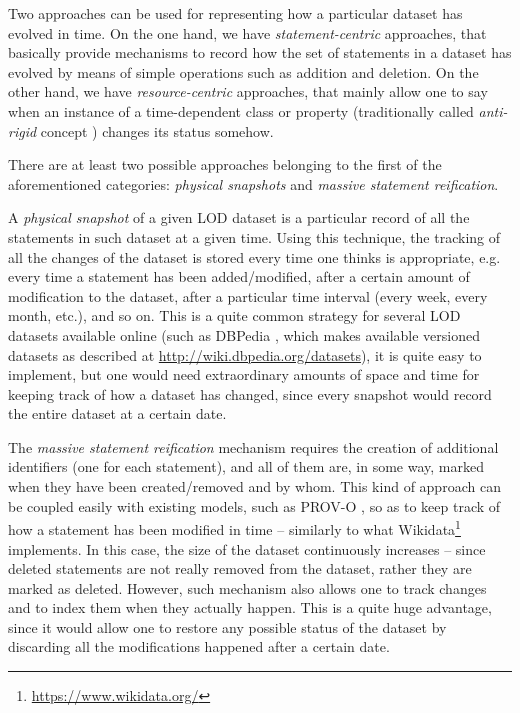 \documentclass[runningheads,a4paper]{llncs}
\begin{document}
Two approaches can be used for representing how a particular dataset has evolved in time. On the one hand, we have {\em statement-centric} approaches, that basically provide mechanisms to record how the set of statements in a dataset has evolved by means of simple operations such as addition and deletion. On the other hand, we have {\em resource-centric} approaches, that mainly allow one to say when an instance of a time-dependent class or property (traditionally called {\em anti-rigid} concept  \cite{__RefNumPara__21031_1591320820}) changes its status somehow.

There are at least two possible approaches belonging to the first of the aforementioned categories: {\em physical snapshots} and {\em massive statement reification}.

A {\em physical snapshot} of a given LOD dataset is a particular record of all the statements in such dataset at a given time. Using this technique, the tracking of all the changes of the dataset is stored every time one thinks is appropriate, e.g. every time a statement has been added/modified, after a certain amount of modification to the dataset, after a particular time interval (every week, every month, etc.), and so on. This is a quite common strategy for several LOD datasets available online (such as DBPedia  \cite{__RefNumPara__17502_1591320820}, which makes available versioned datasets as described at \url{http://wiki.dbpedia.org/datasets}), it is quite easy to implement, but one would need extraordinary amounts of space and time for keeping track of how a dataset has changed, since every snapshot would record the entire dataset at a certain date.

The {\em massive statement reification} mechanism requires the creation of additional identifiers (one for each statement), and all of them are, in some way, marked when they have been created/removed and by whom. This kind of approach can be coupled easily with existing models, such as PROV-O  \cite{__RefNumPara__17349_1591320820}, so as to keep track of how a statement has been modified in time -- similarly to what Wikidata\footnote{\url{https://www.wikidata.org/}} \cite{__RefNumPara__17504_1591320820} implements. In this case, the size of the dataset continuously increases -- since deleted statements are not really removed from the dataset, rather they are marked as deleted. However, such mechanism also allows one to track changes and to index them when they actually happen. This is a quite huge advantage, since it would allow one to restore any possible status of the dataset by discarding all the modifications happened after a certain date.
\end{document}
